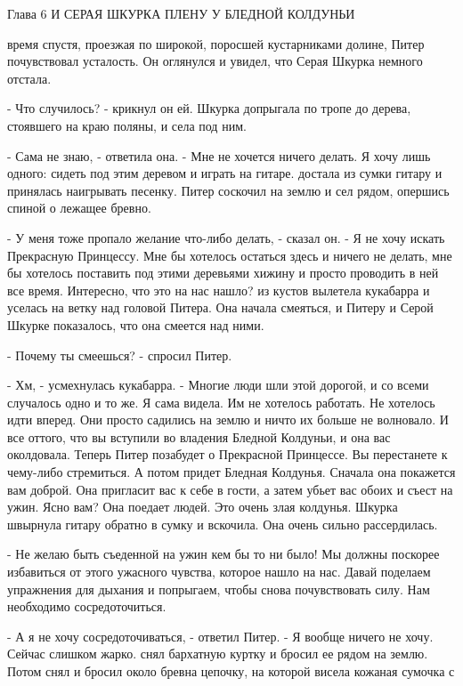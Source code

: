 Глава 6
 И СЕРАЯ ШКУРКА
 ПЛЕНУ У БЛЕДНОЙ КОЛДУНЬИ
\par{} время спустя, проезжая по широкой, поросшей кустарниками 
долине, Питер почувствовал усталость. Он оглянулся и увидел, что Серая 
Шкурка немного отстала.
\par- Что случилось? - крикнул он ей.
 Шкурка допрыгала по тропе до дерева, стоявшего на краю 
поляны, и села под ним.
\par- Сама не знаю, - ответила она. - Мне не хочется ничего делать. Я 
хочу лишь одного: сидеть под этим деревом и играть на гитаре.
 достала из сумки гитару и принялась наигрывать песенку. Питер 
соскочил на землю и сел рядом, опершись спиной о лежащее бревно.
\par- У меня тоже пропало желание что-либо делать, - сказал он. - Я не 
хочу искать Прекрасную Принцессу. Мне бы хотелось остаться здесь и 
ничего не делать, мне бы хотелось поставить под этими деревьями хижину 
и просто проводить в ней все время. Интересно, что это на нас нашло?
 из кустов вылетела кукабарра и уселась на ветку над головой 
Питера. Она начала смеяться, и Питеру и Серой Шкурке показалось, что 
она смеется над ними.
\par- Почему ты смеешься? - спросил Питер.
\par- Хм, - усмехнулась кукабарра. - Многие люди шли этой дорогой, и 
со всеми случалось одно и то же. Я сама видела. Им не хотелось 
работать. Не хотелось идти вперед. Они просто садились на землю и 
ничто их больше не волновало. И все оттого, что вы вступили во 
владения Бледной Колдуньи, и она вас околдовала. Теперь Питер 
позабудет о Прекрасной Принцессе. Вы перестанете к чему-либо 
стремиться. А потом придет Бледная Колдунья. Сначала она покажется вам 
доброй. Она пригласит вас к себе в гости, а затем убьет вас обоих и 
съест на ужин. Ясно вам? Она поедает людей. Это очень злая колдунья.
 Шкурка швырнула гитару обратно в сумку и вскочила. Она очень 
сильно рассердилась.
\par- Не желаю быть съеденной на ужин кем бы то ни было! Мы должны 
поскорее избавиться от этого ужасного чувства, которое нашло на нас. 
Давай поделаем упражнения для дыхания и попрыгаем, чтобы снова 
почувствовать силу. Нам необходимо сосредоточиться.
\par- А я не хочу сосредоточиваться, - ответил Питер. - Я вообще 
ничего не хочу. Сейчас слишком жарко.
 снял бархатную куртку и бросил ее рядом на землю. Потом снял и 
бросил около бревна цепочку, на которой висела кожаная сумочка с 

